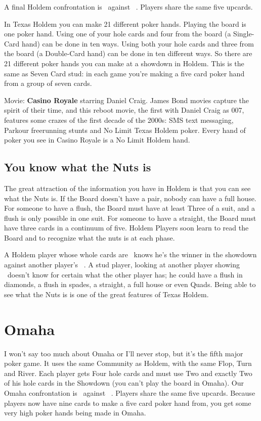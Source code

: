 A final Holdem confrontation is
\back\back\nines\Qd\Jd\tres\fourc\ against
\back\back\nines\Qd\Jd\tres\fourc\ . Players share the same five
upcards.

In Texas Holdem you can make 21 different poker hands. Playing the
board is one poker hand. Using one of your hole cards and four from the
board (a Single-Card hand) can be done in ten ways. Using both your
hole cards and three from the board (a Double-Card hand) can be done
in ten different ways. So there are 21 different poker hands you can
make at a showdown in Holdem. This is the same as Seven Card
stud: in each game you're making a five card poker hand from a
group of seven cards.

Movie: \textbf{Casino Royale} starring Daniel Craig. James Bond movies
capture the spirit of their time, and this reboot movie, the first
with Daniel Craig as 007, features some crazes of the first decade of
the 2000s: SMS text messaging, Parkour freerunning stunts and No Limit
Texas Holdem poker. Every hand of poker you see in Casino Royale is a
No Limit Holdem hand.

\subsection{You know what the Nuts is}

The great attraction of the information you have in Holdem is that you
can see what the Nuts is. If the Board doesn't have a pair, nobody can
have a full house. For someone to have a flush, the Board must have at
least Three of a suit, and a flush is only possible in one suit. For
someone to have a straight, the Board must have three cards in a
continuum of five. Holdem Players soon learn to read the Board and to
recognize what the nuts is at each phase.

A Holdem player whose whole cards are \Ad\tred\ knows he's the winner
in the showdown against another player's
\back\back\nines\Qd\Jd\tres\fourd\ . A stud player, looking at another
player showing \back\back\nines\Qd\Jd\tres\back\ doesn't know for
certain what the other player has; he could have a flush in diamonds,
a flush in spades, a straight, a full house or even Quads. Being able
to see what the Nuts is is one of the great features of Texas Holdem.

\section{Omaha}

I won't say too much about Omaha or I'll never stop, but it's the
fifth major poker game. It uses the same Community as
Holdem, with the same Flop, Turn and River. Each player gets Four hole
cards and must use Two and exactly Two of his hole cards in the
Showdown (you can't play the board in Omaha). Our Omaha confrontation
is 
\back\back\back\back\nines\Qd\Jd\tres\fourd\ against
\back\back\back\back\nines\Qd\Jd\tres\fourd\ . Players share the same five
upcards. Because players now have nine cards to make a five card poker
hand from, you get some very high poker hands being made in Omaha.

